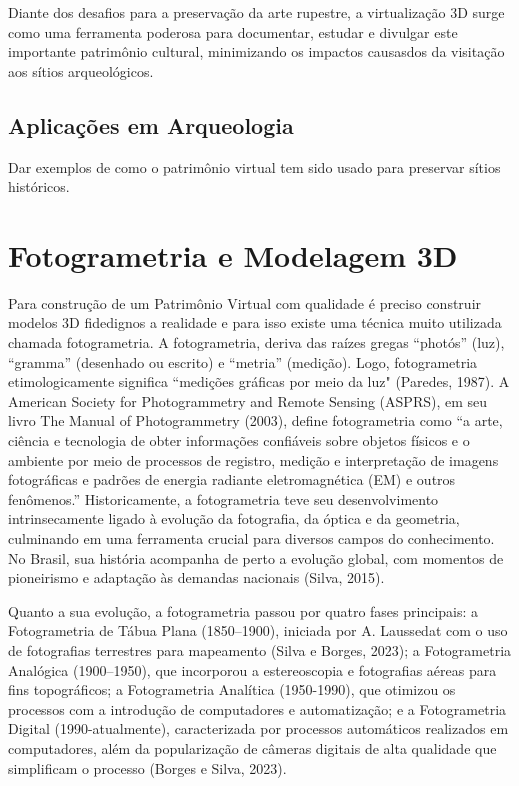Diante dos desafios para a preservação da arte rupestre, a virtualização 3D surge como uma ferramenta poderosa para documentar, estudar e divulgar este importante patrimônio cultural, minimizando os impactos causasdos da visitação aos sítios arqueológicos.

\subsection{Aplicações em Arqueologia}
Dar exemplos de como o patrimônio virtual tem sido usado para preservar sítios históricos.




\section{Fotogrametria e Modelagem 3D}\label{sec:fotogrametria e modelagem 3D}
Para construção de um Patrimônio Virtual com qualidade é preciso construir modelos 3D fidedignos a realidade e para isso existe uma técnica muito utilizada chamada fotogrametria.
A fotogrametria, deriva das raízes gregas “photós” (luz), “gramma” (desenhado ou escrito) e “metria” (medição). Logo, fotogrametria etimologicamente significa “medições gráficas por meio da luz" (Paredes, 1987). A American Society for Photogrammetry and Remote Sensing (ASPRS), em seu livro The Manual of Photogrammetry (2003), define fotogrametria como “a arte, ciência e tecnologia de obter informações confiáveis sobre objetos físicos e o ambiente por meio de processos de registro, medição e interpretação de imagens fotográficas e padrões de energia radiante eletromagnética (EM) e outros fenômenos.”
Historicamente, a fotogrametria  teve seu desenvolvimento intrinsecamente ligado à evolução da fotografia, da óptica e da geometria, culminando em uma ferramenta crucial para diversos campos do conhecimento. No Brasil, sua história acompanha de perto a evolução global, com momentos de pioneirismo e adaptação às demandas nacionais (Silva, 2015).

Quanto a sua evolução, a fotogrametria passou por quatro fases principais: a Fotogrametria de Tábua Plana (1850–1900), iniciada por A. Laussedat com o uso de fotografias terrestres para mapeamento (Silva e Borges, 2023); a Fotogrametria Analógica (1900–1950), que incorporou a estereoscopia e fotografias aéreas para fins topográficos; a Fotogrametria Analítica (1950-1990), que otimizou os processos com a introdução de computadores e automatização; e a Fotogrametria Digital (1990-atualmente), caracterizada por processos automáticos realizados em computadores, além da popularização de câmeras digitais de alta qualidade que simplificam o processo (Borges e Silva, 2023).

